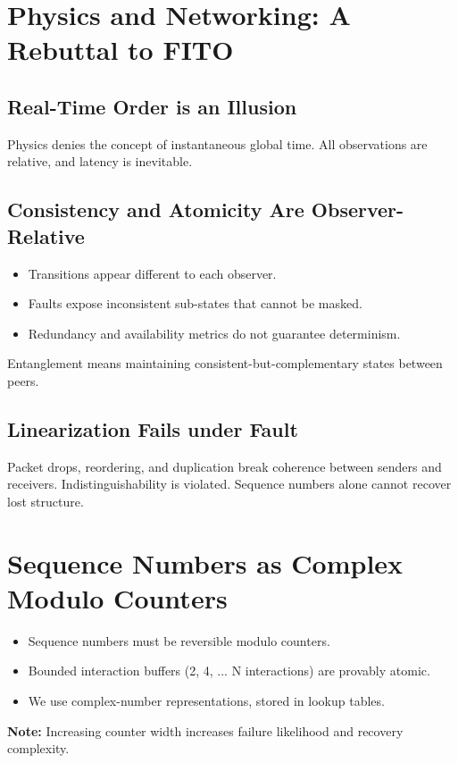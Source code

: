 \documentclass[../../../OAE-SPEC-MAIN.tex]{subfiles}
\begin{document}
\section{Physics and Networking: A Rebuttal to FITO}

\subsection{Real-Time Order is an Illusion}
Physics denies the concept of instantaneous global time. All observations are relative, and latency is inevitable.

\subsection{Consistency and Atomicity Are Observer-Relative}
\begin{itemize}
  \item Transitions appear different to each observer.
  \item Faults expose inconsistent sub-states that cannot be masked.
  \item Redundancy and availability metrics do not guarantee determinism.
\end{itemize}

Entanglement means maintaining consistent-but-complementary states between peers.

\subsection{Linearization Fails under Fault}
Packet drops, reordering, and duplication break coherence between senders and receivers. Indistinguishability is violated. Sequence numbers alone cannot recover lost structure.

\section{Sequence Numbers as Complex Modulo Counters}

\begin{itemize}
  \item Sequence numbers must be reversible modulo counters.
  \item Bounded interaction buffers (2, 4, ... N interactions) are provably atomic.
  \item We use complex-number representations, stored in lookup tables.
\end{itemize}

\textbf{Note:} Increasing counter width increases failure likelihood and recovery complexity.
\end{document}
